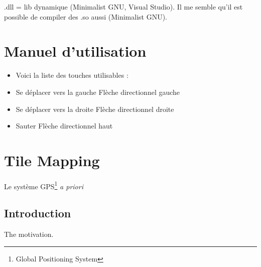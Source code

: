 \documentclass[12pt]{article}
\begin{document}
.dll = lib dynamique (Minimalist GNU, Visual Studio). Il me semble qu'il est possible de compiler des .so aussi (Minimalist GNU).
\newpage

\section{Manuel d'utilisation}
\begin{itemize}
\item Voici la liste des touches utilisables :
\item Se déplacer vers la gauche	Flèche directionnel  gauche
\item Se déplacer vers la droite	Flèche directionnel  droite
\item Sauter	Flèche directionnel  haut
\end{itemize}
\newpage

\section{Tile Mapping}
Le système GPS\footnote{Global Positioning System}
\emph{a priori}
\subsection{Introduction}
The motivation.
\end{document}
